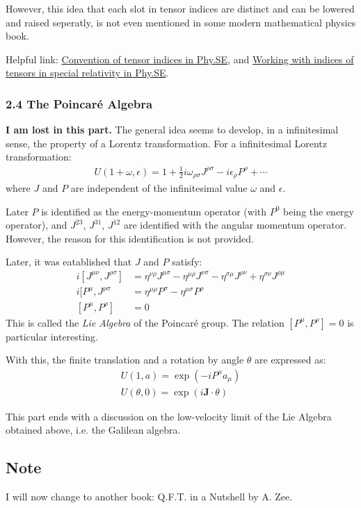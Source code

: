However, this idea that each slot in tensor indices are distinct
and can be lowered and raised seperatly, is not even mentioned
in some modern mathematical physics book.

Helpful link:
\href{http://physics.stackexchange.com/questions/158309/convention-of-tensor-indices}{Convention of tensor indices in Phy.SE}, and 
\href{http://physics.stackexchange.com/questions/237270/working-with-indices-of-tensors-in-special-relativity?noredirect=1&lq=1}{Working with indices of tensors in special relativity in Phy.SE}.

\subsubsection{2.4 The Poincar\'{e} Algebra}
\label{sec:2.4_The_Poincare_Algebra}
\textbf{I am lost in this part.} The general idea seems to develop, in a 
infinitesimal sense, the property of a Lorentz transformation.
For a infinitesimal Lorentz transformation:
\begin{align}
    U(1+\omega, \epsilon) = 
        1+ \frac{1}{2} i\omega_{\rho\sigma}J^{\rho\sigma}
        -i\epsilon_\rho P^\rho + \cdots
\end{align}
where $J$ and $P$ are independent of the infinitesimal value
$\omega$ and $\epsilon$.

Later $P$ is identified as the energy-momentum operator (with
$P^0$ being the energy operator), and $J^{23}$, $J^{31}$,
\(J^{12}\) are identified with the angular momentum operator.
However, the reason for this identification is not provided. 

Later, it was eatablished that $J$ and $P$ satisfy:
\begin{align}
    i[J^{\mu\nu},J^{\rho\sigma}] &=
        \eta^{\nu\rho}J^{\mu\sigma} - \eta^{\mu\rho}J^{\nu\sigma}
        -\eta^{\sigma\mu}J^{\rho\nu} + \eta^{\sigma\nu}J^{\rho\mu}
    \\
    i[P^\mu,J^{\rho\sigma} &=
        \eta^{\mu\rho}P^\sigma - \eta^{\mu\sigma}P^{\rho}
    \\
    [P^\mu,P^\rho] &= 0
\end{align}
This is called the \textit{Lie Algebra} of the Poincar\'{e}
group.
The relation \([P^\mu,P^\rho] = 0\) is particular interesting.

With this, the finite translation and a rotation by angle
$\theta$ are expressed as:
\begin{align}
    U(1,a) = \exp(-iP^\mu a_\mu) \\
    U(\theta,0) = \exp(i \mathbf{J}\cdot \theta)
\end{align}

This part ends with a discussion on the low-velocity limit
of the Lie Algebra obtained above, i.e. the Galilean algebra.

\subsection{Note}
\label{sec:Note}
I will now change to another book: Q.F.T. in a Nutshell by A. Zee.
